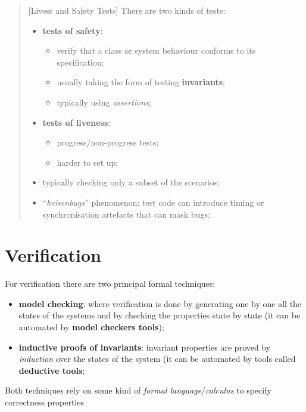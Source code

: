 \begin{quote}[Livess and Safety Tests]
    There are two kinds of tests:
    \begin{itemize}
        \item \textbf{tests of safety}:
            \begin{itemize}
                \item verify that a class or system behaviour conforms to its specification;
                \item usually taking the form of testing \textbf{invariants};
                \item typically using \textit{assertions};
            \end{itemize}
        \item \textbf{tests of liveness}:
            \begin{itemize}
                \item progress/non-progress tests;
                \item harder to set up;
            \end{itemize}
    \end{itemize}
    \begin{warning}[Limitations]
        \begin{itemize}
            \item typically checking only a subset of the scenarios;
            \item ``\textit{heisenbugs}'' phenomenon: test code can introduce timing or synchronisation artefacts that can mask bugs;
        \end{itemize}
    \end{warning}
\end{quote}
%
\section{Verification}\label{sec:an_verification} %
For verification there are two principal formal techniques:
\begin{itemize}
    \item \textbf{model checking}: where verification is done by generating one by one all the states of the systems and by checking the properties state by state (it can be automated by \textbf{model checkers tools});
    \item \textbf{inductive proofs of invariants}: invariant properties are proved by \textit{induction} over the states of the system (it can be automated by tools called \textbf{deductive tools};
\end{itemize}
\begin{note}
    Both techniques rely on some kind of \textit{formal language}/\textit{calculus} to specify correctness properties
\end{note}
%
